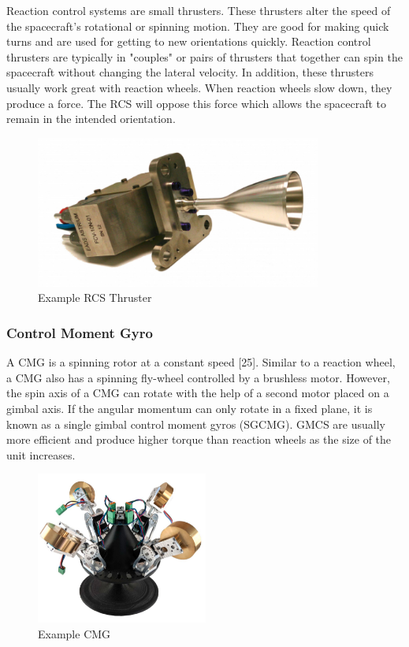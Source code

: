 Reaction control systems are small thrusters. These thrusters alter
the speed of the spacecraft's rotational or spinning motion. They are
good for making quick turns and are used for getting to new
orientations quickly. Reaction control thrusters are typically in
"couples" or pairs of thrusters that together can spin the spacecraft
without changing the lateral velocity. In addition, these thrusters
usually work great with reaction wheels. When reaction wheels slow
down, they produce a force. The RCS will oppose this force which
allows the spacecraft to remain in the intended
orientation\cite{qp23}.
\begin{figure}[H]
  \begin{center}
  \includegraphics[height=50mm]{Figures/RCS}
  \end{center}
  \caption{Example RCS Thruster \cite{qp24}}
\end{figure}

\subsubsection{Control Moment Gyro}

A CMG is a spinning rotor at a constant speed [25]. Similar to a
reaction wheel, a CMG also has a spinning fly-wheel controlled by a
brushless motor. However, the spin axis of a CMG can rotate with the
help of a second motor placed on a gimbal axis. If the angular
momentum can only rotate in a fixed plane, it is known as a single
gimbal control moment gyros (SGCMG). GMCS are usually more efficient
and produce higher torque than reaction wheels as the size of the unit
increases\cite{qp26}.
\begin{figure}[H]
  \begin{center}
  \includegraphics[height=50mm]{Figures/CMG}
  \end{center}
  \caption{Example CMG \cite{qp27}}
\end{figure}

